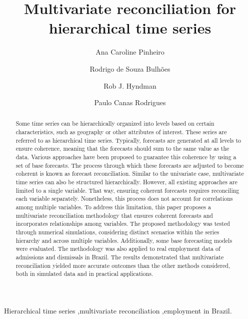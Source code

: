 \documentclass[a4paper,preprint,11pt,authoryear]{elsarticle}
\begin{document}
\begin{frontmatter}
  \title{Multivariate reconciliation for hierarchical time series}

  \author[label1,label2]{Ana Caroline Pinheiro} %
  \author[label1]{Rodrigo de Souza Bulhões}
  \author[label3]{Rob J. Hyndman}
  \author[label1,label4]{Paulo Canas Rodrigues}



  \begin{abstract}
    Some time series can be hierarchically organized into levels based on certain characteristics, such as geography or other attributes of interest. These series are referred to as hierarchical time series. Typically, forecasts are generated at all levels to ensure coherence, meaning that the forecasts should sum to the same value as the data. Various approaches have been proposed to guarantee this coherence by using a set of base forecasts. The process through which these forecasts are adjusted to become coherent is known as forecast reconciliation. Similar to the univariate case, multivariate time series can also be structured hierarchically. However, all existing approaches are limited to a single variable. That way, ensuring coherent forecasts requires reconciling each variable separately. Nonetheless, this process does not account for correlations among multiple variables. To address this limitation, this paper proposes a multivariate reconciliation methodology that ensures coherent forecasts and incorporates relationships among variables. The proposed methodology was tested through numerical simulations, considering distinct scenarios within the series hierarchy and across multiple variables. Additionally, some base forecasting models were evaluated. The methodology was also applied to real employment data of admissions and dismissals in Brazil. The results demonstrated that multivariate reconciliation yielded more accurate outcomes than the other methods considered, both in simulated data and in practical applications.
  \end{abstract}

  \begin{keyword}
    Hierarchical time series \sep multivariate reconciliation \sep employment in Brazil.
  \end{keyword}
\end{frontmatter}
\end{document}
